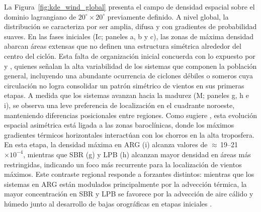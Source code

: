 La Figura~\ref{fig:kde_wind_global} presenta el campo de densidad espacial sobre el dominio lagrangiano de $20^\circ \times 20^\circ$ previamente definido. A nivel global, la distribución se caracteriza por ser amplia, difusa y con gradientes de probabilidad suaves. En las fases iniciales (Ic; paneles a, b y c), las zonas de máxima densidad abarcan áreas extensas que no definen una estructura simétrica alrededor del centro del ciclón. Esta falta de organización inicial concuerda con lo expuesto por \citet{reboita2010south} y \citet{gozzo2017climatology}, quienes señalan la alta variabilidad de los sistemas que componen la población general, incluyendo una abundante ocurrencia de ciclones débiles o someros cuya circulación no logra consolidar un patrón simétrico de vientos en sus primeras etapas.
A medida que los sistemas avanzan hacia la madurez (M; paneles g, h e i), se observa una leve preferencia de localización en el cuadrante noroeste, manteniendo diferencias posicionales entre regiones. Como sugiere \citet{dossantos2023response}, esta evolución espacial asimétrica está ligada a las zonas baroclínicas, donde los máximos gradientes térmicos horizontales interactúan con los chorros en la alta troposfera.
En esta etapa, la densidad m\'axima en ARG (i) alcanza valores de $\approx$\,19--21 $\times 10^{-4}$, mientras que SBR (g) y LPB (h) alcanzan mayor densidad en \'areas m\'as restringidas, indicando un foco más recurrente para la localización de vientos máximos. Este contraste regional responde a forzantes distintos: mientras que los sistemas en ARG están modulados principalmente por la advección térmica, la mayor concentración en SBR y LPB se favorece por la advección de aire cálido y húmedo junto al desarrollo de bajas orográficas en etapas iniciales \citep{gramcianinov2019properties, cardoso2022synoptic}.

